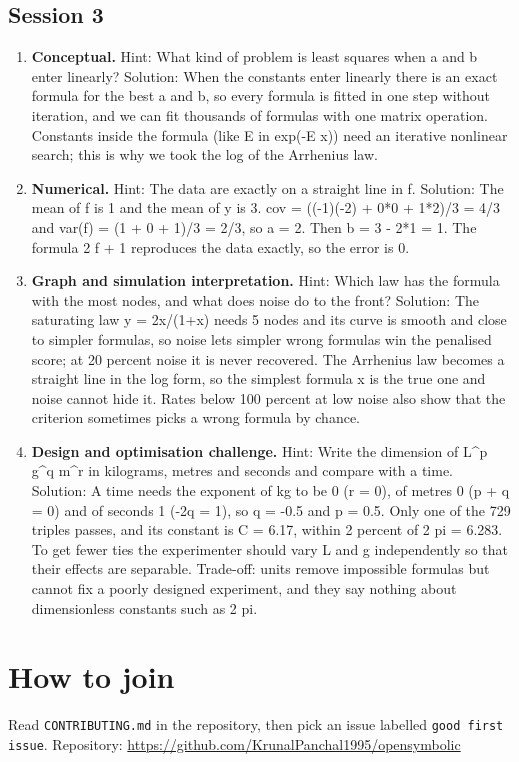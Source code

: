 \documentclass[11pt,a4paper]{article}
\begin{document}
\subsection*{Session 3}
\begin{enumerate}[nosep]
\item \textbf{Conceptual.} Hint: What kind of problem is least squares when a and b enter linearly? Solution: When the constants enter linearly there is an exact formula for the best a and b, so every formula is fitted in one step without iteration, and we can fit thousands of formulas with one matrix operation. Constants inside the formula (like E in exp(-E x)) need an iterative nonlinear search; this is why we took the log of the Arrhenius law.
\item \textbf{Numerical.} Hint: The data are exactly on a straight line in f. Solution: The mean of f is 1 and the mean of y is 3. cov = ((-1)(-2) + 0*0 + 1*2)/3 = 4/3 and var(f) = (1 + 0 + 1)/3 = 2/3, so a = 2. Then b = 3 - 2*1 = 1. The formula 2 f + 1 reproduces the data exactly, so the error is 0.
\item \textbf{Graph and simulation interpretation.} Hint: Which law has the formula with the most nodes, and what does noise do to the front? Solution: The saturating law y = 2x/(1+x) needs 5 nodes and its curve is smooth and close to simpler formulas, so noise lets simpler wrong formulas win the penalised score; at 20 percent noise it is never recovered. The Arrhenius law becomes a straight line in the log form, so the simplest formula x is the true one and noise cannot hide it. Rates below 100 percent at low noise also show that the criterion sometimes picks a wrong formula by chance.
\item \textbf{Design and optimisation challenge.} Hint: Write the dimension of L\textasciicircum{}p g\textasciicircum{}q m\textasciicircum{}r in kilograms, metres and seconds and compare with a time. Solution: A time needs the exponent of kg to be 0 (r = 0), of metres 0 (p + q = 0) and of seconds 1 (-2q = 1), so q = -0.5 and p = 0.5. Only one of the 729 triples passes, and its constant is C = 6.17, within 2 percent of 2 pi = 6.283. To get fewer ties the experimenter should vary L and g independently so that their effects are separable. Trade-off: units remove impossible formulas but cannot fix a poorly designed experiment, and they say nothing about dimensionless constants such as 2 pi.
\end{enumerate}

\section{How to join}
Read \texttt{CONTRIBUTING.md} in the repository, then pick an issue labelled \texttt{good first issue}. Repository: \url{https://github.com/KrunalPanchal1995/opensymbolic}
\end{document}
